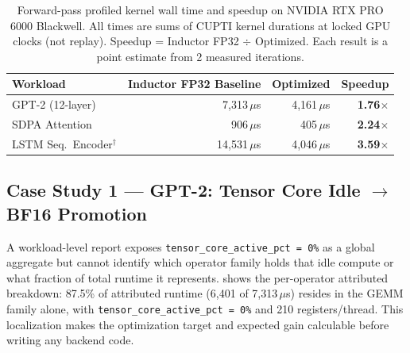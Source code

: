 \begin{table}[h]
\centering
\caption{Forward-pass profiled kernel wall time and speedup on NVIDIA RTX PRO 6000 Blackwell.
  All times are sums of \nsys CUPTI kernel durations at locked GPU clocks (not \ncu replay).
  Speedup = Inductor FP32 $\div$ Optimized.  Each result is a point estimate from
  2 measured iterations.}
\label{tab:speedup}
\small
\setlength{\tabcolsep}{5pt}
\begin{tabular}{lrrr}
\toprule
\textbf{Workload} & \textbf{Inductor FP32 Baseline} & \textbf{Optimized}
                  & \textbf{Speedup} \\
\midrule
GPT-2 (12-layer)        & 7,313\,$\mu$s  & 4,161\,$\mu$s  & \textbf{1.76$\times$} \\
SDPA Attention          & 906\,$\mu$s    & 405\,$\mu$s    & \textbf{2.24$\times$} \\
LSTM Seq.\ Encoder$^\dagger$ & 14,531\,$\mu$s & 4,046\,$\mu$s  & \textbf{3.59$\times$} \\
\bottomrule
\end{tabular}
\vspace{4pt}

\end{table}


\subsection{Case Study 1 --- GPT-2: Tensor Core Idle $\to$ BF16 Promotion}
\label{sec:cs:gpt2}

A workload-level \ncu report exposes \texttt{tensor\_core\_active\_pct = 0\%} as a global
aggregate but cannot identify which operator family holds that idle compute or what fraction
of total runtime it represents.   shows the per-operator attributed
breakdown: 87.5\% of attributed runtime (6{,}401 of 7{,}313\,$\mu$s) resides in the GEMM
family alone, with \texttt{tensor\_core\_active\_pct = 0\%} and 210 registers/thread.  This
localization makes the optimization target and expected gain calculable before writing any
backend code.

